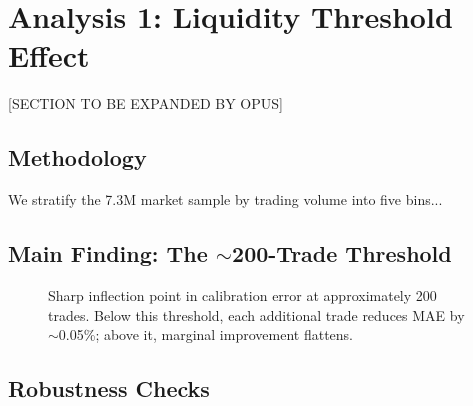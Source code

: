 \section{Analysis 1: Liquidity Threshold Effect}
\label{sec:analysis1}

[SECTION TO BE EXPANDED BY OPUS]


\subsection{Methodology}
\label{subsec:a1_method}

We stratify the 7.3M market sample by trading volume into five bins...

\subsection{Main Finding: The $\sim$200-Trade Threshold}
\label{subsec:a1_finding}

\begin{figure}[h]
\centering
{}
\caption{Sharp inflection point in calibration error at approximately 200 trades. Below this threshold, each additional trade reduces MAE by $\sim$0.05\%; above it, marginal improvement flattens.}
\label{fig:threshold_main}
\end{figure}

\subsection{Robustness Checks}
\label{subsec:a1_robust}

